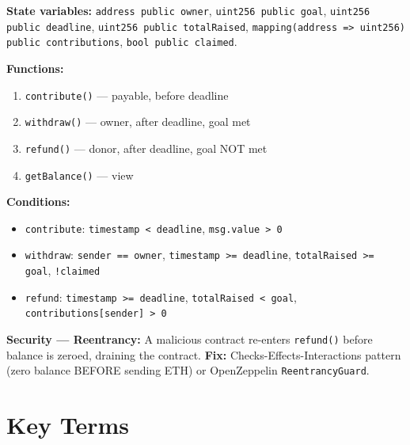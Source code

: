 \documentclass[11pt,a4paper]{article}
\begin{document}
\begin{answerbox}
\small
\textbf{State variables:} \texttt{address public owner}, \texttt{uint256 public goal}, \texttt{uint256 public deadline}, \texttt{uint256 public totalRaised}, \texttt{mapping(address => uint256) public contributions}, \texttt{bool public claimed}.

\textbf{Functions:}
\begin{enumerate}[leftmargin=1.2em]
\item \texttt{contribute()} --- payable, before deadline
\item \texttt{withdraw()} --- owner, after deadline, goal met
\item \texttt{refund()} --- donor, after deadline, goal NOT met
\item \texttt{getBalance()} --- view
\end{enumerate}

\textbf{Conditions:}
\begin{itemize}[leftmargin=1.2em]
\item \texttt{contribute}: \texttt{timestamp < deadline}, \texttt{msg.value > 0}
\item \texttt{withdraw}: \texttt{sender == owner}, \texttt{timestamp >= deadline}, \texttt{totalRaised >= goal}, \texttt{!claimed}
\item \texttt{refund}: \texttt{timestamp >= deadline}, \texttt{totalRaised < goal}, \texttt{contributions[sender] > 0}
\end{itemize}

\textbf{Security --- Reentrancy:} A malicious contract re-enters \texttt{refund()} before balance is zeroed, draining the contract. \textbf{Fix:} Checks-Effects-Interactions pattern (zero balance BEFORE sending ETH) or OpenZeppelin \texttt{ReentrancyGuard}.
\end{answerbox}

\vspace{4pt}

\section{Key Terms}
\end{document}
